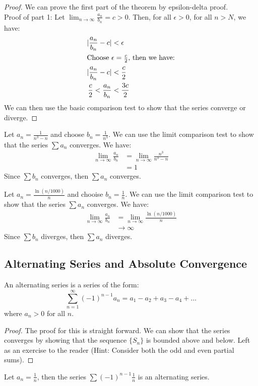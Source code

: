 \documentclass[11pt]{article}
\begin{document}
\begin{proof}
    We can prove the first part of the theorem by epsilon-delta proof. 
    \\
    Proof of part 1: Let $\lim_{n \to \infty} \frac{a_n}{b_n} = c > 0$. Then, for all $\epsilon > 0$, for all $n > N$, we have:
    \begin{align*}
        |\frac{a_n}{b_n} - c| &< \epsilon \\
        \intertext{Choose $\epsilon = \frac{c}{2}$, then we have:}
        |\frac{a_n}{b_n} - c| &< \frac{c}{2} \\
        \frac{c}{2} < \frac{a_n}{b_n} &< \frac{3c}{2} \\
    \end{align*}
    We can then use the basic comparison test to show that the series converge or diverge.
\end{proof}
\begin{example}
    Let $a_n = \frac{1}{n^3 - n}$ and choose $b_n = \frac{1}{n^3}$. We can use the limit comparison test to show that the series $\sum a_n$ converges. We have:
    \begin{align*}
        \lim_{n \to \infty} \frac{a_n}{b_n} &= \lim_{n \to \infty} \frac{n^3}{n^3 - n} \\
        &= 1
    \end{align*}
    Since $\sum b_n$ converges, then $\sum a_n$ converges.
\end{example}
\begin{example}
    Let $a_n = \frac{\ln(n/1000)}{n}$ and chooise $b_n = \frac{1}{n}$. We can use the limit comparison test to show that the series $\sum a_n$ converges. We have:
    \begin{align*}
        \lim_{n \to \infty} \frac{a_n}{b_n} &= \lim_{n \to \infty} \frac{\ln(n/1000)}{n} \\
        &\to \infty
    \end{align*}
    Since $\sum b_n$ diverges, then $\sum a_n$ diverges.
\end{example}
\subsection{Alternating Series and Absolute Convergence}
\begin{definition}
    An alternating series is a series of the form:
    \begin{equation}
        \sum_{n=1}^{\infty} (-1)^{n-1} a_n = a_1 - a_2 + a_3 - a_4 + \ldots
    \end{equation}
    where $a_n > 0$ for all $n$.
\end{definition}
\begin{proof}
    The proof for this is straight forward. We can show that the series converges by showing that the sequence $\{S_n\}$ is bounded above and below. Left as an exercise to the reader (Hint: Consider both the odd and even partial sums).
\end{proof}
\begin{example}
    Let $a_n = \frac{1}{n}$, then the series $\sum (-1)^{n-1} \frac{1}{n}$ is an alternating series.
\end{example}
\end{document}
